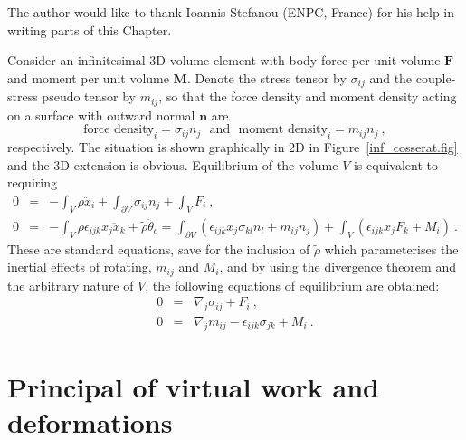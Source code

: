 \documentclass[]{scrreprt}
\newcommand{\si}{\sigma}
\newcommand{\mand}{\ \ \ \mbox{and}\ \ \ }
\newcommand{\pl}{\partial}
\newcommand{\ep}{\epsilon}
\newcommand{\non}{\nonumber}
\begin{document}
The author would like to thank Ioannis Stefanou (ENPC, France) for his
help in writing parts of this Chapter.

Consider an infinitesimal 3D volume element with body force per unit
volume $\mathbf{F}$ and moment per unit volume $\mathbf{M}$.  Denote
the stress tensor by $\si_{ij}$ and the couple-stress pseudo tensor by
$m_{ij}$, so that the force density and moment density acting on a
surface with outward normal $\mathbf{n}$ are
$$
\mbox{force density}_{i} = \si_{ij}n_{j} \mand
\mbox{moment density}_{i} = m_{ij}n_{j} \ ,
$$
respectively.  The situation is shown graphically in 2D in
Figure~\ref{inf_cosserat.fig} and the 3D extension is obvious.
Equilibrium of the volume $V$ is equivalent to requiring
\begin{eqnarray*}
0 & = & -\int_{V}\rho \ddot{x}_{i} + \int_{\pl V}\si_{ij}n_{j} +
\int_{V}F_{i} \ , \\
0 & = & -\int_{V}\rho \ep_{ijk}x_{j}\ddot{x}_{k} + \tilde{\rho}\ddot{\theta}_{c} =
\int_{\pl V}\left(\ep_{ijk}x_{j}\si_{kl}n_{l} + m_{ij}n_{j}\right) +
\int_{V}\left(\ep_{ijk}x_{j}F_{k} + M_{i}\right) \ .
\end{eqnarray*}
These are standard equations, save for the inclusion of $\tilde{\rho}$
which parameterises the inertial effects of rotating, $m_{ij}$ and
$M_{i}$, and by using the divergence theorem and the arbitrary nature
of $V$, the following equations of equilibrium are obtained:
\begin{eqnarray}
0 & = & \nabla_{j}\si_{ij} + F_{i} \ , \non \\
0 & = & \nabla_{j}m_{ij} - \ep_{ijk}\si_{jk} + M_{i} \ .
\label{eqns.equjilb}
\end{eqnarray}

\section{Principal of virtual work and deformations}
\label{pov.sec}
\end{document}
